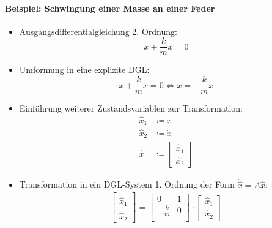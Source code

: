             \paragraph{Beispiel: Schwingung einer Masse an einer Feder}
                \begin{itemize}
                	\item Ausgangsdifferentialgleichung 2. Ordnung:
	                	\begin{equation*}
		                	\ddot{x} + \frac{k}{m} x = 0
	                	\end{equation*}
	                \item Umformung in eine explizite DGL:
		                \begin{equation*}
			                \ddot{x} + \frac{k}{m} x = 0 \iff \ddot{x} = - \frac{k}{m} x
		                \end{equation*}
	                \item Einführung weiterer Zustandsvariablen zur Transformation:
		                \begin{align*}
			                \hat{x} _ 1 &\coloneqq x \\
			                \hat{x} _ 2 &\coloneqq \dot{x} \\
			                \hat{x}     &\coloneqq
				                \begin{bmatrix}
					                \hat{x} _ 1 \\
					                \hat{x} _ 2
				                \end{bmatrix}
		                \end{align*}
		            \item Transformation in ein DGL-System 1. Ordnung der Form \( \dot{\hat{x}} = A\hat{x} \):
			            \begin{align*}
				            \begin{bmatrix}
					            \dot{\hat{x}} _ 1 \\
					            \dot{\hat{x}} _ 2
				            \end{bmatrix}
				            =
				            \begin{bmatrix}
					            0            & 1 \\
					            -\frac{k}{m} & 0 \\
				            \end{bmatrix}
				            \cdot
				            \begin{bmatrix}
					            \hat{x} _ 1 \\
					            \hat{x} _ 2
				            \end{bmatrix}
			            \end{align*}
                \end{itemize}

